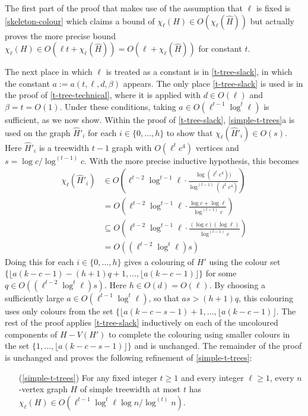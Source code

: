 \documentclass[kpfonts]{patmorin}
\newcommand{\lrn}{\chi_{\ell}}
\theoremstyle{named}
\newcommand{\weirdref}[2]{\cref{#1}#2}
\begin{document}
The first part of the proof that makes use of the assumption that $\ell$ is fixed is \cref{skeleton-colour} which claims a bound of $\lrn(H)\in O(\lrn(\hat{H}))$ but actually proves the more precise bound $\lrn(H)\in O(\ell t+ \lrn(\hat{H}))=O(\ell+\lrn(\hat{H}))$ for constant $t$.

The next place in which $\ell$ is treated as a constant is in \cref{t-tree-slack}, in which the constant $a:=a(t,\ell,d,\beta)$ appears.  The only place \cref{t-tree-slack} is used is in the proof of \cref{t-tree-technical}, where it is applied with $d\in O(\ell)$ and $\beta=t=O(1)$.  Under these conditions, taking $a\in O(\ell^{t-1}\log^t \ell)$ is sufficient, as we now show. Within the proof of \cref{t-tree-slack}, \weirdref{simple-t-trees}{a} is used on the graph $\hat{H}'_i$ for each $i\in\{0,\ldots,h\}$ to show that $\lrn(\hat{H}'_i)\in O(s)$.  Here $\hat{H}'_i$ is a treewidth $t-1$ graph with $O(\ell^t c^4)$ vertices and $s=\log c/\log^{(t-1)} c$.  With the more precise inductive hypothesis, this becomes
\begin{align*}
    \lrn(\hat{H}'_i) & \in O\left(\ell^{t-2}\log^{t-1}\ell
    \cdot \frac{\log (\ell^{t} c^4))}{\log^{(t-1)} (\ell^t c^4)}\right) \\
    & = O\left(\ell^{t-2}\log^{t-1}\ell\cdot \frac{\log c + \log\ell}{\log^{(t-1)} c}\right) \\
    & \subseteq O\left(\ell^{t-2}\log^{t-1}\ell\cdot \frac{(\log c)(\log\ell)}{\log^{(t-1)} c}\right) \\
    & = O((\ell^{t-2}\log^t\ell)s)
\end{align*}
Doing this for each $i\in\{0,\ldots,h\}$ gives a colouring of $H'$ using the colour set $\{\lfloor a(k-c-1)-(h+1)q+1,\ldots,\lfloor a(k-c-1)\rfloor\}$ for some $q\in O((\ell^{t-2}\log^t\ell)s)$.  Here $h\in O(d)=O(\ell)$. By choosing a sufficiently large $a\in O(\ell^{t-1}\log^t\ell)$, so that $as > (h+1)q$, this colouring uses only colours from the set $\{\lfloor a(k-c-s-1)+1,\ldots,\lfloor a(k-c-1)\rfloor$.  The rest of the proof applies \cref{t-tree-slack} inductively on each of the uncoloured components of $H-V(H')$ to complete the colouring using smaller colours in the set $\{1,\ldots,\lfloor a(k-c-s-1)\rfloor\}$ and is unchanged.  The remainder of the proof is unchanged and proves the following refinement of \cref{simple-t-trees}:

\begin{itemize}
    \item[(\ref{simple-t-trees})] For any fixed integer $t\ge 1$ and every integer $\ell\ge 1$, every $n$-vertex graph $H$ of simple treewidth at most $t$ has $\lrn(H)\in O(\ell^{t-1}\log^t \ell\log n/\log^{(t)} n)$.
\end{itemize}
\end{document}
